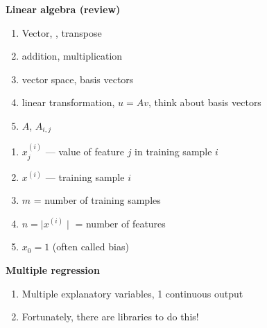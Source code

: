 \textbf{Linear algebra (review)}
\begin{enumerate}
\item Vector, , transpose
\item addition, multiplication
\item vector space, basis vectors
\item linear transformation, $u=Av$, think about basis vectors
\item $A$, $A_{i,j}$
\end{enumerate}

\begin{enumerate}
\item $x_j^{(i)}$ --- value of feature $j$ in training sample $i$
\item $x^{(i)}$ --- training sample $i$
\item $m$ = number of training samples
\item $n = \mid x^{(i)} \mid$ = number of features
\item $x_0 = 1$ (often called bias)
\end{enumerate}

\textbf{Multiple regression}
\begin{enumerate}
\item Multiple explanatory variables, 1 continuous output
\item Fortunately, there are libraries to do this!
\end{enumerate}

